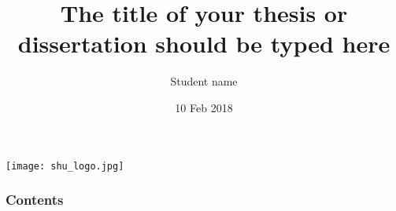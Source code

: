 \documentclass[compress,serif,11pt]{beamer}
\title[{\sc The short title of your thesis } \hspace{0.8cm} \insertframenumber/\inserttotalframenumber]{{\sc The title of your thesis or dissertation should be typed here }}
\author[Presentation to some students --- {\sc Feb 10\superscript{th}, 2018}]{{Student name}}
\date{10 Feb 2018}
\institute{Department of Mathematics \\ Shanghai University}
\begin{document}
\begin{frame}[plain]
  \begin{center}
    \vspace{-0.1cm}
    \texttt{[image: shu\_logo.jpg]}
  \end{center}
  \titlepage
\end{frame}

\begin{frame}
\frametitle{Contents}
\begin{multicols}{2}
  \tableofcontents
\end{multicols}
\end{frame}

















\end{document}

